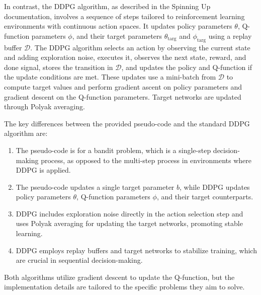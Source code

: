 \documentclass{article}
\begin{document}
In contrast, the DDPG algorithm, as described in the Spinning Up documentation, involves a sequence of steps tailored to reinforcement learning environments with continuous action spaces. It updates policy parameters \( \theta \), Q-function parameters \( \phi \), and their target parameters \( \theta_{\text{targ}} \) and \( \phi_{\text{targ}} \) using a replay buffer \( \mathcal{D} \). The DDPG algorithm selects an action by observing the current state and adding exploration noise, executes it, observes the next state, reward, and done signal, stores the transition in \( \mathcal{D} \), and updates the policy and Q-function if the update conditions are met. These updates use a mini-batch from \( \mathcal{D} \) to compute target values and perform gradient ascent on policy parameters and gradient descent on the Q-function parameters. Target networks are updated through Polyak averaging.

The key differences between the provided pseudo-code and the standard DDPG algorithm are:

\begin{enumerate}
  \item The pseudo-code is for a bandit problem, which is a single-step decision-making process, as opposed to the multi-step process in environments where DDPG is applied.
  \item The pseudo-code updates a single target parameter \( b \), while DDPG updates policy parameters \( \theta \), Q-function parameters \( \phi \), and their target counterparts.
  \item DDPG includes exploration noise directly in the action selection step and uses Polyak averaging for updating the target networks, promoting stable learning.
  \item DDPG employs replay buffers and target networks to stabilize training, which are crucial in sequential decision-making.
\end{enumerate}

Both algorithms utilize gradient descent to update the Q-function, but the implementation details are tailored to the specific problems they aim to solve.
\end{document}
